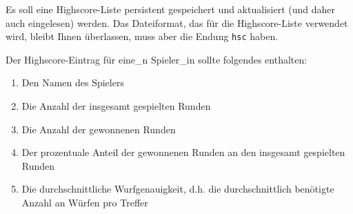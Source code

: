 Es soll eine Highscore-Liste persistent gespeichert und aktualisiert (und daher auch eingelesen) werden. 
Das Dateiformat, das für die Highscore-Liste verwendet wird, bleibt Ihnen überlassen, muss aber die Endung \texttt{hsc} haben.

Der Highscore-Eintrag für eine\_n Spieler\_in sollte folgendes enthalten:

\begin{enumerate}
\item Den Namen des Spielers
\item Die Anzahl der insgesamt gespielten Runden
\item Die Anzahl der gewonnenen Runden
\item Der prozentuale Anteil der gewonnenen Runden an den insgesamt gespielten Runden
\item Die durchschnittliche Wurfgenauigkeit, d.h. die durchschnittlich benötigte Anzahl an Würfen pro Treffer
\end{enumerate}





